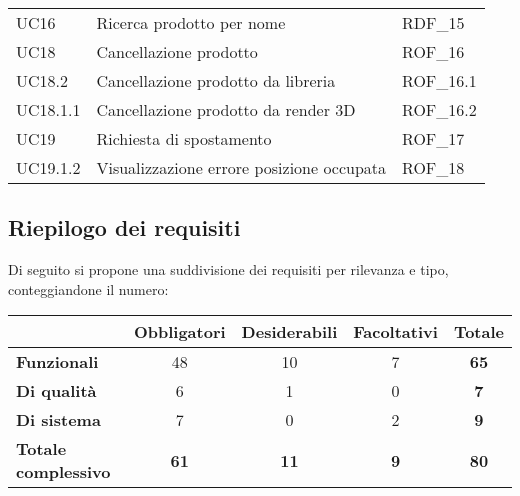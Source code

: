 \begin{xltabular}{\textwidth}{ p{0.3\textwidth} | X | p{0.2\textwidth} }
    UC16 & Ricerca prodotto per nome & RDF\_15\\
    UC18 & Cancellazione prodotto & ROF\_16\\
    UC18.2 & Cancellazione prodotto da libreria & ROF\_16.1\\
    UC18.1.1 & Cancellazione prodotto da render 3D & ROF\_16.2\\
    UC19 & Richiesta di spostamento & ROF\_17\\
    UC19.1.2 & Visualizzazione errore posizione occupata & ROF\_18\\
    
    \hline
\end{xltabular}

\subsection{Riepilogo dei requisiti}\label{subsec:riepilogo}
Di seguito si propone una suddivisione dei requisiti per rilevanza e tipo, conteggiandone il numero:

\begin{table}[h]
    \centering
    \renewcommand\tabularxcolumn[1]{m{#1}} %
    \renewcommand{\arraystretch}{1.5}
    \begin{tabular}{|l|c|c|c||c|}
        \hline
        \rowcolor{black}
        \multicolumn{1}{|c|}{\cellcolor{white}Tipo\textbackslash Priorità} & \textbf{\color{white}Obbligatori} & \textbf{\color{white}Desiderabili} & \textbf{\color{white}Facoltativi} & \textbf{\color{white}Totale}\\ 
        \hline

        \cellcolor{black} \textbf{\color{white}Funzionali} & 48 & 10 & 7 & \textbf{65}\\
        \cellcolor{black} \textbf{\color{white}Di qualità} & 6 & 1 & 0 & \textbf{7}\\
        \cellcolor{black} \textbf{\color{white}Di sistema} & 7 & 0 & 2 & \textbf{9}\\

        \hline\hline
        \cellcolor{black} \textbf{\color{white}Totale complessivo} & \textbf{61} & \textbf{11} & \textbf{9} & \textbf{80}\\
        \hline
    \end{tabular}
\end{table}


\newpage
